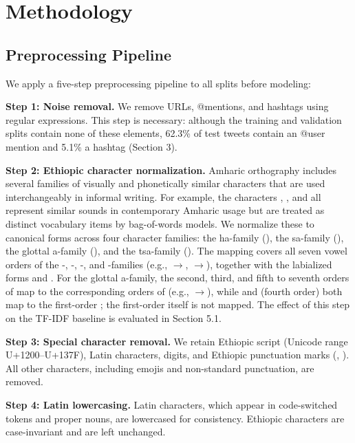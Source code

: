 \section{Methodology}

\subsection{Preprocessing Pipeline}

We apply a five-step preprocessing pipeline to all splits before modeling:

\textbf{Step 1: Noise removal.} We remove URLs, @mentions, and hashtags using regular expressions. This step is necessary: although the training and validation splits contain none of these elements, 62.3\% of test tweets contain an @user mention and 5.1\% a hashtag (Section 3).

\textbf{Step 2: Ethiopic character normalization.} Amharic orthography includes several families of visually and phonetically similar characters that are used interchangeably in informal writing. For example, the characters , , and  all represent similar sounds in contemporary Amharic usage but are treated as distinct vocabulary items by bag-of-words models. We normalize these to canonical forms across four character families: the ha-family (), the sa-family (), the glottal a-family (), and the tsa-family (). The mapping covers all seven vowel orders of the -, -, -, and -families (e.g., $\rightarrow$, $\rightarrow$), together with the labialized forms  and . For the glottal a-family, the second, third, and fifth to seventh orders of  map to the corresponding orders of  (e.g., $\rightarrow$), while  and  (fourth order) both map to the first-order ; the first-order  itself is not mapped. The effect of this step on the TF-IDF baseline is evaluated in Section 5.1.

\textbf{Step 3: Special character removal.} We retain Ethiopic script (Unicode range U+1200--U+137F), Latin characters, digits, and Ethiopic punctuation marks (, ). All other characters, including emojis and non-standard punctuation, are removed.

\textbf{Step 4: Latin lowercasing.} Latin characters, which appear in code-switched tokens and proper nouns, are lowercased for consistency. Ethiopic characters are case-invariant and are left unchanged.

